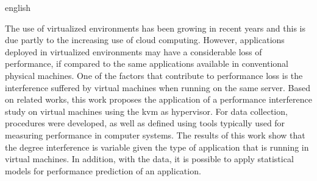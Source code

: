 \begin{resumo}[Abstract]
 \begin{otherlanguage*}{english}
 
The use of virtualized environments has been growing in recent years and this is due partly to the increasing use of cloud computing. However, applications deployed in virtualized environments may have a considerable loss of performance, if compared to the same applications available in conventional physical machines. One of the factors that contribute to performance loss is the interference suffered by virtual machines when running on the same server. Based on related works, this work proposes the application of a performance interference study on virtual machines using the kvm as hypervisor. For data collection, procedures were developed, as well as defined using tools typically used for measuring performance in computer systems. The results of this work show that the degree interference is variable given the type of application that is running in virtual machines. In addition, with the data, it is possible to apply statistical models for performance prediction of an application. 








\end{otherlanguage*}
\end{resumo}
